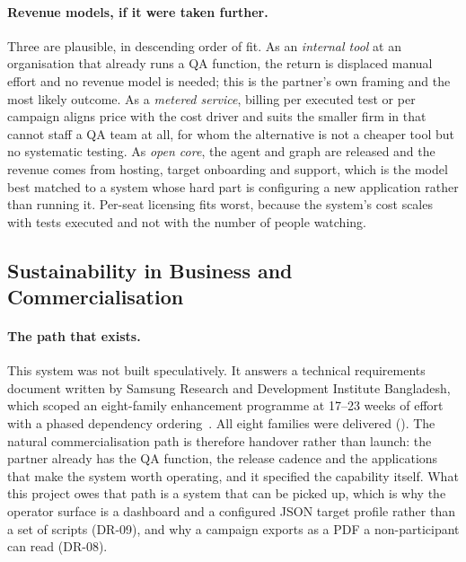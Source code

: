 \paragraph{Revenue models, if it were taken further.} Three are plausible, in
descending order of fit. As an \emph{internal tool} at an organisation that
already runs a QA function, the return is displaced manual effort and no
revenue model is needed; this is the partner's own framing and the most likely
outcome. As a \emph{metered service}, billing per executed test or per campaign
aligns price with the cost driver and suits the smaller firm in
 that cannot staff a QA team at all, for whom the alternative
is not a cheaper tool but no systematic testing. As \emph{open core}, the agent
and graph are released and the revenue comes from hosting, target onboarding
and support, which is the model best matched to a system whose hard part is
configuring a new application rather than running it. Per-seat licensing fits
worst, because the system's cost scales with tests executed and not with the
number of people watching.

\subsection{Sustainability in Business and Commercialisation}
\label{sec:commercialisation}

\paragraph{The path that exists.} This system was not built speculatively. It
answers a technical requirements document written by Samsung Research and
Development Institute Bangladesh, which scoped an eight-family enhancement
programme at 17--23 weeks of effort with a phased dependency
ordering~\cite{etatr}. All eight families were delivered
(). The natural commercialisation path is therefore
handover rather than launch: the partner already has the QA function, the
release cadence and the applications that make the system worth operating, and
it specified the capability itself. What this project owes that path is a
system that can be picked up, which is why the operator surface is a dashboard
and a configured JSON target profile rather than a set of scripts (DR-09), and
why a campaign exports as a PDF a non-participant can read (DR-08).

